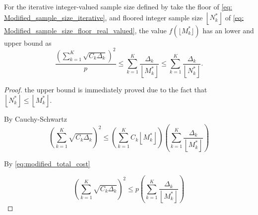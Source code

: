 \begin{theorem}

For the iterative integer-valued sample size defined by take the floor of \eqref{eq: Modified_sample_size_iterative},  and floored integer sample size $\left\lfloor N_k^* \right\rfloor$ of \eqref{eq: Modified_sample_size_floor_real_valued}, the value $f(\lfloor M_k^* \rfloor)$ has an lower and upper bound as
\[
\frac{\left(\sum_{k=1}^K\sqrt{C_k\Delta_k}\right)^2}{p}\le \sum_{k=1}^K \frac{\Delta_k}{\left\lfloor M_k^* \right\rfloor}\le \sum_{k=1}^K \frac{\Delta_k}{\left\lfloor N_k^* \right\rfloor}.
\]
\end{theorem}


\begin{proof}
    the upper bound is immediately proved due to the fact that $\left\lfloor N_k^* \right\rfloor\le \left\lfloor M_k^* \right\rfloor$.


    By Cauchy-Schwartz
    \[
    \left(\sum_{k=1}^K \sqrt{C_k\Delta_k}\right)^2\le  \left(\sum_{k=1}^KC_k\left\lfloor M_k^* \right\rfloor\right) \left(\sum_{k=1}^K\frac{\Delta_k}{\left\lfloor M_k^* \right\rfloor}\right)
    \]
    
    By \eqref{eq:modified_total_cost}

    \[
    \left(\sum_{k=1}^K \sqrt{C_k\Delta_k}\right)^2\le  p \left(\sum_{k=1}^K\frac{\Delta_k}{\left\lfloor M_k^* \right\rfloor}\right)
    \]
\end{proof}





